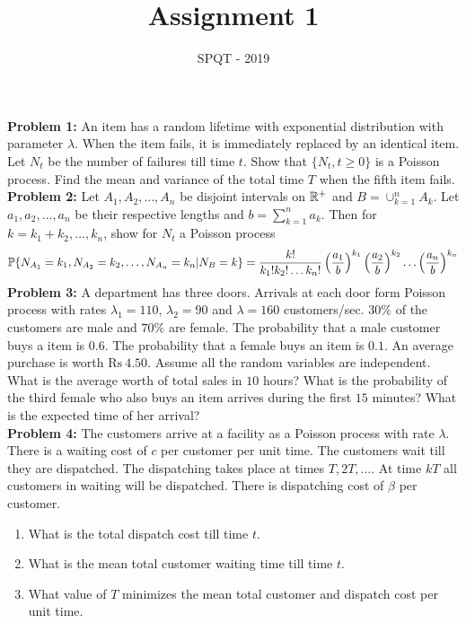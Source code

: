 \documentclass[a4paper,11pt,english]{article}
\title{Assignment 1}
\author{SPQT - 2019}
\begin{document}
\maketitle
\textbf{Problem 1:} An item has a random lifetime with exponential distribution with parameter $\lambda$. When the item fails, it is immediately replaced by an identical item. Let $N_t$ be the number of failures till time $t$. Show that $\{N_t, t \geq 0\}$ is a Poisson process. Find the mean and variance of the total time $T$ when the fifth item fails. \\
\indent \textbf{Problem 2:} Let $A_1, A_2, \ldots, A_n$ be disjoint intervals on $\R^+$ and $B = \cup_{k=1}^n A_k$. Let $a_1,a_2,\ldots,a_n$ be their respective lengths and $b = \sum_{k=1}^n a_k$. Then for $k = k_1+k_2,\ldots,k_n$, show for $N_t$ a Poisson process
\begin{align*}
\P\{N_{A_1}=k_1,N_{A_2}=k_2,\ldots,N_{A_n}=k_n|N_B =k\} = \frac{k!}{k_1!k_2!\ldots k_n!}\left(\frac{a_1}{b}\right)^{k_1}\left(\frac{a_2}{b}\right)^{k_2}\ldots\left(\frac{a_n}{b}\right)^{k_n}
\end{align*}
\indent \textbf{Problem 3:} A department has three doors. Arrivals at each door form Poisson process with rates $\lambda_1 = 110$, $\lambda_2 = 90$ and $\lambda = 160$ customers/sec. $30\%$ of the customers are male and $70\%$ are female. The probability that a male customer buys a item is $0.6$. The probability that a female buys an item is $0.1$. An average purchase is worth $\mathrm{Rs}\ 4.50$. Assume all the random variables are independent. What is the average worth of total sales in $10$ hours? What is the probability of the third female who also buys an item arrives during the first $15$ minutes? What is the expected time of her arrival?\\
\indent \textbf{Problem 4:} The customers arrive at a facility as a Poisson process with rate $\lambda$. There is a waiting cost of $c$ per customer per unit time. The customers wait till they are dispatched. The dispatching takes place at times $T,2T,\ldots$. At time $kT$ all customers in waiting will be dispatched. There is dispatching cost of $\beta$ per customer. 
\begin{enumerate}
\item What is the total dispatch cost till time $t$.
\item What is the mean total customer waiting time till time $t$.
\item What value of $T$ minimizes the mean total customer and dispatch cost per unit time. 
\end{enumerate}
\end{document}
